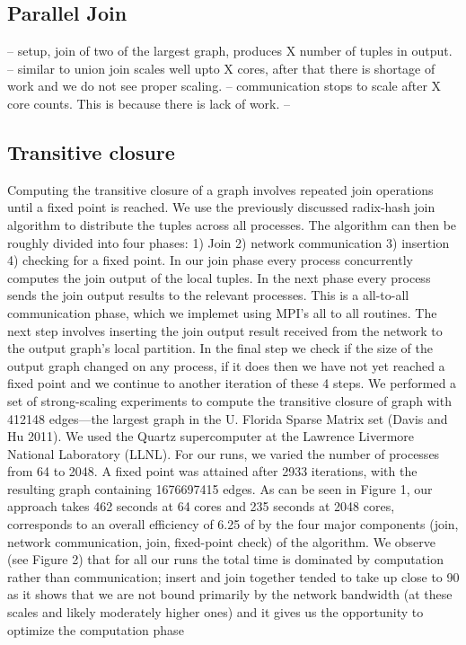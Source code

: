\subsection{Parallel Join}
\label{sec:join}
-- setup, join of two of the largest graph, produces X number of tuples in output.
-- similar to union join scales well upto X cores, after that there is shortage of work and we do not see proper scaling.
-- communication stops to scale after X core counts. This is because there is lack of work.
-- 


\subsection{Transitive closure}
\label{sec:tc}

Computing the transitive closure of a graph involves repeated join operations until a fixed point is reached. We
use the previously discussed radix-hash join algorithm to distribute the tuples across all processes. The algorithm
can then be roughly divided into four phases: 1) Join 2) network communication 3) insertion 4) checking for a
fixed point. In our join phase every process concurrently computes the join output of the local tuples. In the next
phase every process sends the join output results to the relevant processes. This is a all-to-all communication
phase, which we implemet using MPI’s all to all routines. The next step involves inserting the join output result
received from the network to the output graph’s local partition. In the final step we check if the size of the
output graph changed on any process, if it does then we have not yet reached a fixed point and we continue to
another iteration of these 4 steps.
We performed a set of strong-scaling experiments to compute the transitive closure of graph with 412148
edges—the largest graph in the U. Florida Sparse Matrix set (Davis and Hu 2011). We used the Quartz supercomputer
at the Lawrence Livermore National Laboratory (LLNL). For our runs, we varied the number of processes
from 64 to 2048. A fixed point was attained after 2933 iterations, with the resulting graph containing 1676697415
edges. As can be seen in Figure 1, our approach takes 462 seconds at 64 cores and 235 seconds at 2048 cores, corresponds
to an overall efficiency of 6.25%
of by the four major components (join, network communication, join, fixed-point check) of the algorithm. We
observe (see Figure 2) that for all our runs the total time is dominated by computation rather than communication;
insert and join together tended to take up close to 90%
as it shows that we are not bound primarily by the network bandwidth (at these scales and likely moderately
higher ones) and it gives us the opportunity to optimize the computation phase

